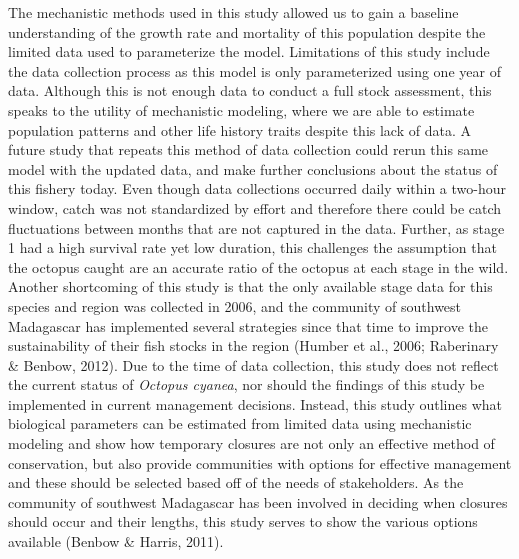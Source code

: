 \documentclass[
]{article}
\begin{document}
The mechanistic methods used in this study allowed us to gain a baseline understanding of the growth rate and mortality of this population despite the limited data used to parameterize the model. Limitations of this study include the data collection process as this model is only parameterized using one year of data. Although this is not enough data to conduct a full stock assessment, this speaks to the utility of mechanistic modeling, where we are able to estimate population patterns and other life history traits despite this lack of data. A future study that repeats this method of data collection could rerun this same model with the updated data, and make further conclusions about the status of this fishery today. Even though data collections occurred daily within a two-hour window, catch was not standardized by effort and therefore there could be catch fluctuations between months that are not captured in the data. Further, as stage 1 had a high survival rate yet low duration, this challenges the assumption that the octopus caught are an accurate ratio of the octopus at each stage in the wild. Another shortcoming of this study is that the only available stage data for this species and region was collected in 2006, and the community of southwest Madagascar has implemented several strategies since that time to improve the sustainability of their fish stocks in the region (Humber et al., 2006; Raberinary \& Benbow, 2012). Due to the time of data collection, this study does not reflect the current status of \emph{Octopus cyanea}, nor should the findings of this study be implemented in current management decisions. Instead, this study outlines what biological parameters can be estimated from limited data using mechanistic modeling and show how temporary closures are not only an effective method of conservation, but also provide communities with options for effective management and these should be selected based off of the needs of stakeholders. As the community of southwest Madagascar has been involved in deciding when closures should occur and their lengths, this study serves to show the various options available (Benbow \& Harris, 2011).
\end{document}
